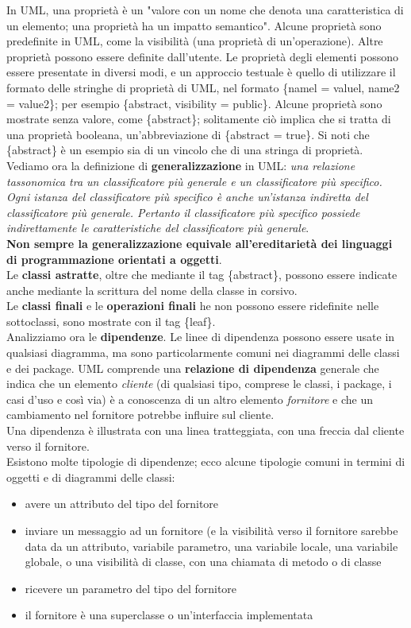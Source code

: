 \documentclass[a4paper,12pt, oneside]{book}
\begin{document}
In UML, una proprietà è un "valore con un nome che denota una caratteristica di un elemento; una proprietà ha un impatto semantico". Alcune proprietà sono
predefinite in UML, come la visibilità (una proprietà di un'operazione). Altre proprietà
possono essere definite dall'utente.
Le proprietà degli elementi possono essere presentate in diversi modi, e un approccio
testuale è quello di utilizzare il formato delle stringhe di proprietà di UML, nel formato
\{namel = valuel, name2 = value2\}; per esempio \{abstract, visibility = public\}. Alcune
proprietà sono mostrate senza valore, come \{abstract\}; solitamente ciò implica che si
tratta di una proprietà booleana, un'abbreviazione di \{abstract = true\}. Si noti che \{abstract\} è un esempio sia di un vincolo che di una stringa di proprietà.
\newpage
Vediamo ora la definizione di \textbf{generalizzazione} in UML: \textit{una relazione tassonomica tra un classificatore più generale e un classificatore più specifico. Ogni istanza del classificatore più specifico è anche un'istanza indiretta del classificatore più generale. Pertanto il classificatore più specifico possiede indirettamente le caratteristiche del classificatore più generale}.\\
\textbf{Non sempre la generalizzazione equivale all'ereditarietà dei linguaggi di programmazione orientati a oggetti}.\\
Le \textbf{classi astratte}, oltre che mediante il tag \{abstract\}, possono essere indicate anche mediante la scrittura del nome della classe in corsivo. \\
Le \textbf{classi finali} e le \textbf{operazioni finali} he non possono essere ridefinite nelle sottoclassi, sono mostrate con il tag \{leaf\}.\\
Analizziamo ora le \textbf{dipendenze}. Le linee di dipendenza possono essere usate in qualsiasi diagramma, ma sono particolarmente comuni nei diagrammi delle classi e dei package. UML comprende una \textbf{relazione di dipendenza} generale che indica che un elemento \textit{cliente} (di qualsiasi tipo, comprese le classi, i package, i casi d'uso e così via) è a conoscenza di un altro elemento \textit{fornitore} e che un cambiamento nel fornitore potrebbe influire sul cliente.\\
Una dipendenza è illustrata con una linea tratteggiata, con una freccia dal cliente verso il fornitore.\\
Esistono molte tipologie di dipendenze; ecco alcune tipologie comuni in termini di oggetti e di diagrammi delle classi:
\begin{itemize}
	\item avere un attributo del tipo del fornitore
	\item inviare un messaggio ad un fornitore (e la visibilità verso il fornitore sarebbe data da un attributo, variabile parametro, una variabile locale, una variabile globale, o una visibilità di classe, con una chiamata di metodo o di classe
	\item ricevere un parametro del tipo del fornitore
	\item il fornitore è una superclasse o un'interfaccia implementata
\end{itemize}
\end{document}

